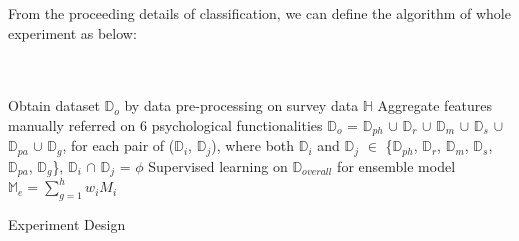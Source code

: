 \documentclass[12pt]{article}
\begin{document}
From the proceeding details of classification, we can define the algorithm of whole experiment as below: \\\\\\
\IncMargin{2em}
\begin{algorithm}[H]
\BlankLine
Obtain dataset $\mathbb{D}_{o}$ by data pre-processing on survey data $\mathbb{H}$\;
Aggregate features manually referred on 6 psychological functionalities \;
$\mathbb{D}_{o}$ = $\mathbb{D}_{ph}$ $\cup$ $\mathbb{D}_{r}$ $\cup$ $\mathbb{D}_{m}$ $\cup$  $\mathbb{D}_{s}$ $\cup$ $\mathbb{D}_{pa}$ $\cup$ $\mathbb{D}_{g}$, for each pair of ($\mathbb{D}_{i}$, $\mathbb{D}_{j}$), where both $\mathbb{D}_{i}$ and  $\mathbb{D}_{j}$ $\in$ \{$\mathbb{D}_{ph}$, $\mathbb{D}_{r}$, $\mathbb{D}_{m}$, $\mathbb{D}_{s}$, $\mathbb{D}_{pa}$, $\mathbb{D}_{g}$\}, $\mathbb{D}_{i}$ $\cap$ $\mathbb{D}_{j}$ = $\phi$\;
Supervised learning on $\mathbb{D}_{overall}$ for ensemble model $\mathbb{M}_{e} = \sum_{g = 1}^{h} w_{i} M_{i} $\;
\caption{Experiment Design}\label{experiment}
\end{algorithm}\DecMargin{2em}
\end{document}
